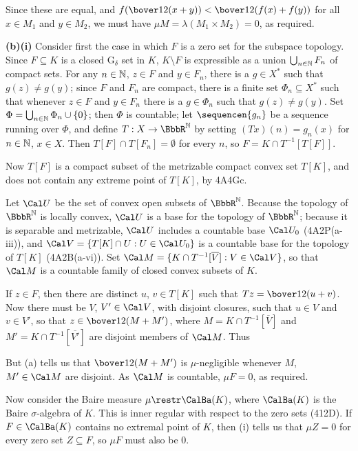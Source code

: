 {\noindent Since these are equal, and $f(\bover12(x+y))<\bover12(f(x)+f(y))$
for all $x\in M_1$ and $y\in M_2$, we must have
$\mu M=\lambda(M_1\times M_2)=0$, as required.

\medskip

{\bf (b)(i)} Consider first the case in which $F$ is a zero set for the
subspace topology.   Since $F\subseteq K$ is a closed
G$_{\delta}$ set in $K$, $K\setminus F$ is expressible as a union
$\bigcup_{n\in\Bbb N}F_n$ of compact sets.   For any $n\in\Bbb N$,
$z\in F$ and $y\in F_n$, there is a $g\in X^*$ such that $g(z)\ne g(y)$;
since $F$ and $F_n$ are compact, there is a finite set
$\Phi_n\subseteq X^*$ such that whenever $z\in F$ and $y\in F_n$
there is a $g\in\Phi_n$ such that $g(z)\ne g(y)$.   Set
$\Phi=\bigcup_{n\in\Bbb N}\Phi_n\cup\{0\}$;  then
$\Phi$ is countable;  let $\sequencen{g_n}$ be a sequence running over
$\Phi$, and define $T:X\to\BbbR^{\Bbb N}$ by setting $(Tx)(n)=g_n(x)$
for $n\in\Bbb N$, $x\in X$.   Then $T[F]\cap T[F_n]=\emptyset$ for every
$n$, so $F=K\cap T^{-1}[T[F]]$.

Now $T[F]$ is a compact subset of the metrizable
compact convex set $T[K]$,
and does not contain any extreme point of $T[K]$, by 4A4Gc.

Let $\Cal U$ be the set of convex open subsets of
$\BbbR^{\Bbb N}$.   Because the topology of $\BbbR^{\Bbb N}$ is
locally convex, $\Cal U$ is a base
for the topology of $\BbbR^{\Bbb N}$;  because it is separable and
metrizable, $\Cal U$ includes a countable base $\Cal U_0$ (4A2P(a-iii)),
and $\Cal V=\{T[K]\cap U:U\in\Cal U_0\}$ is a countable base
for the topology of $T[K]$ (4A2B(a-vi)).   Set
$\Cal M=\{K\cap T^{-1}[\overline{V}]:V\in\Cal V\}$, so that
$\Cal M$ is a countable family of closed convex subsets of $K$.

If $z\in F$, then there are distinct $u$, $v\in T[K]$ such that
$Tz=\bover12(u+v)$.   Now there must be $V$, $V'\in\Cal V$, with disjoint
closures, such that $u\in V$ and $v\in V'$, so that
$z\in\bover12(M+M')$, where $M=K\cap T^{-1}[\overline{V}]$ and
$M'=K\cap T^{-1}[\overline{V'}]$ are disjoint members of $\Cal M$.   Thus


\noindent But (a) tells us that $\bover12(M+M')$ is
$\mu$-negligible whenever $M$, $M'\in\Cal M$ are disjoint.
As $\Cal M$ is countable, $\mu F=0$, as required.

\medskip

 Now consider the Baire measure $\mu\restr\CalBa(K)$, where
$\CalBa(K)$ is the Baire $\sigma$-algebra of $K$.   This is inner regular
with respect to the zero sets (412D).   If $F\in\CalBa(K)$ contains no
extremal point of $K$, then (i) tells us that $\mu Z=0$ for every zero set
$Z\subseteq F$, so $\mu F$ must also be $0$.
}%

